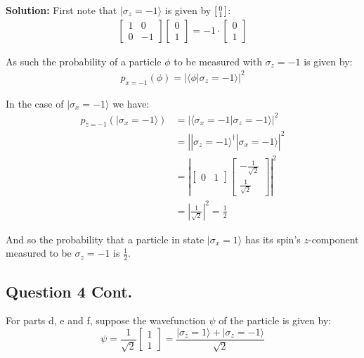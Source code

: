 \documentclass{article}
\newcommand{\icol}[1]{%
  \begin{bsmallmatrix}#1\end{bsmallmatrix}%
}
\begin{document}
\noindent\textbf{Solution:} First note that $|\sigma_z=-1\rangle$ is given by $\icol{0\\1}$:
\begin{align*}
    \begin{bmatrix}
        1&0\\0&-1
    \end{bmatrix}\begin{bmatrix}
        0\\1
    \end{bmatrix}=-1\cdot\begin{bmatrix}
        0\\1
    \end{bmatrix}
\end{align*} 

As such the probability of a particle $\phi$ to be measured with $\sigma_z=-1$ is given by:
\begin{align*}
    p_{x=-1}(\phi)=\left|\langle\phi|\sigma_z=-1\rangle\right|^2
\end{align*}

In the case of $|\sigma_x=-1\rangle$ we have:
\begin{align*}
    p_{z=-1}(|\sigma_x=-1\rangle)&=\left|\langle\sigma_x=-1|\sigma_z=-1\rangle\right|^2\\
    &=\left||\sigma_z=-1\rangle^\dagger|\sigma_x=-1\rangle\right|^2\\
    &=\left|\begin{bmatrix}
        0&1
    \end{bmatrix}\begin{bmatrix}
        -\frac{1}{\sqrt{2}}\\\frac{1}{\sqrt{2}}
    \end{bmatrix}\right|^2\\
    &=\left|\frac{1}{\sqrt{2}}\right|^2=\frac{1}{2}
\end{align*}

And so the probability that a particle in state $|\sigma_x=1\rangle$ has its spin's $z$-component measured to be $\sigma_z=-1$ is $\frac{1}{2}$.
\bigskip

\subsection*{Question 4 Cont.}
For parts d, e and f, suppose the wavefunction $\psi$ of the particle is given by:
$$\psi=\frac{1}{\sqrt{2}}\begin{bmatrix}
    1\\1
\end{bmatrix}=\frac{|\sigma_z=1\rangle+|\sigma_z=-1\rangle}{\sqrt{2}}$$
\bigskip
\end{document}
